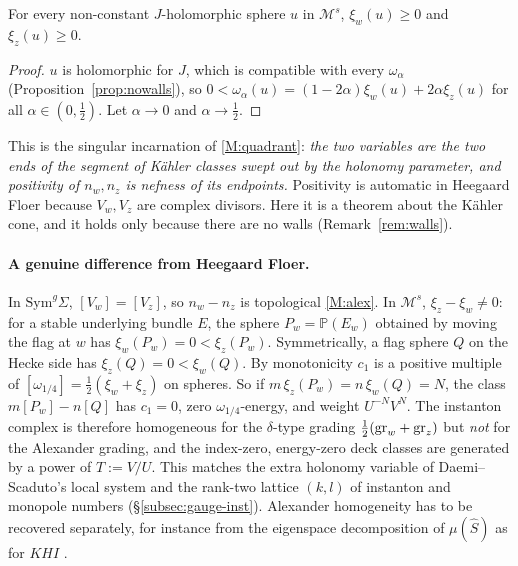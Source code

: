 \begin{proposition}\label{prop:nef}
For every non-constant $J$-holomorphic sphere $u$ in $\mathcal M^s$, $\xi_w(u)\ge0$ and $\xi_z(u)\ge0$.
\end{proposition}
\begin{proof}
$u$ is holomorphic for $J$, which is compatible with every $\omega_\alpha$ (Proposition~\ref{prop:nowalls}), so
$0<\omega_\alpha(u)=(1-2\alpha)\xi_w(u)+2\alpha\xi_z(u)$ for all $\alpha\in(0,\tfrac12)$.  Let $\alpha\to0$ and $\alpha\to\tfrac12$.
\end{proof}

This is the singular incarnation of \ref{M:quadrant}: \emph{the two variables are the two ends of the segment of
Kähler classes swept out by the holonomy parameter, and positivity of $n_w,n_z$ is nefness of its endpoints.}
Positivity is automatic in Heegaard Floer because $V_w,V_z$ are complex divisors.  Here it is a theorem about
the Kähler cone, and it holds only because there are no walls (Remark~\ref{rem:walls}).

\paragraph{A genuine difference from Heegaard Floer.}
In $\mathrm{Sym}^g\Sigma$, $[V_w]=[V_z]$, so $n_w-n_z$ is topological \ref{M:alex}.  In $\mathcal M^s$, $\xi_z-\xi_w\neq0$:
for a stable underlying bundle $E$, the sphere $P_w=\mathbb P(E_w)$ obtained by moving the flag at $w$ has
$\xi_w(P_w)=0<\xi_z(P_w)$.  Symmetrically, a flag sphere $Q$ on the Hecke side has $\xi_z(Q)=0<\xi_w(Q)$.  By
monotonicity $c_1$ is a positive multiple of $[\omega_{1/4}]=\frac12(\xi_w+\xi_z)$ on spheres.  So if
$m\,\xi_z(P_w)=n\,\xi_w(Q)=N$, the class $m[P_w]-n[Q]$ has $c_1=0$, zero $\omega_{1/4}$-energy, and weight
$U^{-N}V^{N}$.  The instanton complex is therefore homogeneous for the $\delta$-type grading
$\tfrac12(\mathrm{gr}_w+\mathrm{gr}_z)$ but \emph{not} for the Alexander grading, and the index-zero, energy-zero deck classes
are generated by a power of $T:=V/U$.  This matches the extra holonomy variable of Daemi--Scaduto's local system and the rank-two lattice
$(k,l)$ of instanton and monopole numbers (\S\ref{subsec:gauge-inst}).  Alexander homogeneity has to be recovered
separately, for instance from the eigenspace decomposition of $\mu(\hat S)$ as for $KHI$ \cite{KM-sutures}.

